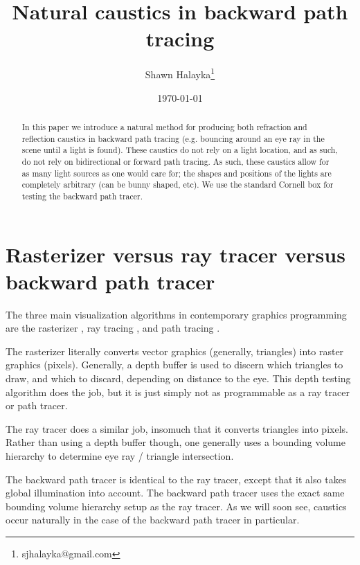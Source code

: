 \documentclass[12pt]{article}
\title{Natural caustics in backward path tracing}
\author{
Shawn Halayka\footnote{sjhalayka@gmail.com}
}
\date{\today\;\currenttime}
\begin{document}
\newcommand{\abs}[1]{\lvert#1\rvert}



\maketitle




\begin{abstract}
In this paper we introduce a natural method for producing both refraction and reflection caustics in backward path tracing (e.g. bouncing around an eye ray in the scene until a light is found).
These caustics do not rely on a light location, and as such, do not rely on bidirectional or forward path tracing.
As such, these caustics allow for as many light sources as one would care for; the shapes and positions of the lights are completely arbitrary (can be bunny shaped, etc).
We use the standard Cornell box for testing the backward path tracer.
\end{abstract}

\section{Rasterizer versus ray tracer versus backward path tracer}

The three main visualization algorithms in contemporary graphics programming are the rasterizer \cite{noll}, ray tracing \cite{appel}, and path tracing \cite{kajiya}.

The rasterizer literally converts vector graphics (generally, triangles) into raster graphics (pixels).
Generally, a depth buffer is used to discern which triangles to draw, and which to discard, depending on distance to the eye.
This depth testing algorithm does the job, but it is just simply not as programmable as a ray tracer or path tracer.

The ray tracer does a similar job, insomuch that it converts triangles into pixels.
Rather than using a depth buffer though, one generally uses a bounding volume hierarchy to determine eye ray / triangle intersection.

The backward path tracer is identical to the ray tracer, except that it also takes global illumination into account.
The backward path tracer uses the exact same bounding volume hierarchy setup as the ray tracer.
As we will soon see, caustics occur naturally in the case of the backward path tracer in particular.
\end{document}

